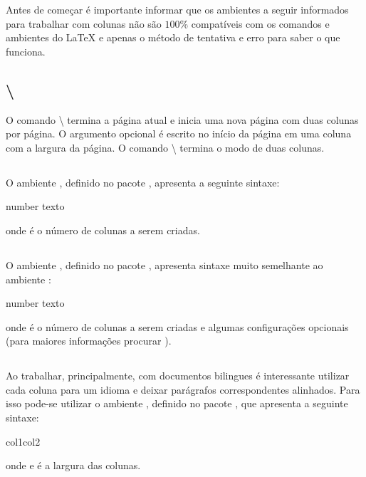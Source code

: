 Antes de começar é importante informar que os ambientes a seguir informados para trabalhar com colunas não são $100$\% compatíveis com os comandos e ambientes do LaTeX e apenas o método de tentativa e erro para saber o que funciona.

\subsection{\textbackslash{}}
O comando \textbackslash{} termina a página atual e inicia uma nova página com duas colunas por página. O argumento opcional  é escrito no início da página em uma coluna com a largura da página. O comando \textbackslash{} termina o modo de duas colunas.

\subsection{} \nocite{Mitttelbach:2009:Multicolumn}
O ambiente , definido no pacote , apresenta a seguinte sintaxe:
\begin{latexcode}
    \begin{multicols}{number}
        texto
    \end{multicols}
\end{latexcode}
onde  é o número de colunas a serem criadas.

\subsection{} \nocite{Sauer:2004:Parcolumns}
O ambiente , definido no pacote , apresenta sintaxe muito semelhante ao ambiente :
\begin{latexcode}
    \begin{parcolumns}[options]{number}
        texto
    \end{parcolumns}
\end{latexcode}
onde  é o número de colunas a serem criadas e  algumas configurações opcionais (para maiores informações procurar \cite{Sauer:2004:Parcolumns}).

\subsection{}
Ao trabalhar, principalmente, com documentos bilingues é interessante utilizar cada coluna para um idioma e deixar parágrafos correspondentes alinhados. Para isso pode-se utilizar o ambiente , definido no pacote , que apresenta a seguinte sintaxe:
\begin{latexcode}
    \begin{Parallel}{col1}{col2}
        \ParallelPar
    \end{Parallel}
\end{latexcode}
onde  e  é a largura das colunas.

